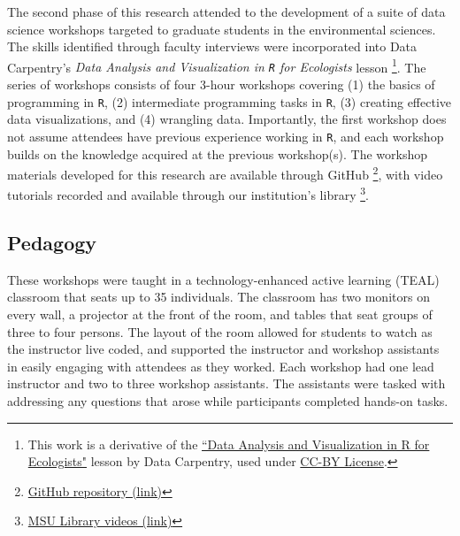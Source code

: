 \documentclass[12pt]{article}
\begin{document}
\noindent The second phase of this research attended to the  development of a 
suite of data science workshops targeted to graduate students in the 
environmental sciences. The skills identified through faculty interviews were
incorporated into Data Carpentry's \emph{Data Analysis and Visualization in 
\texttt{R} for Ecologists} lesson \citep{ecology_curriculum}\footnote{This
work is a derivative of the \href{https://datacarpentry.org/R-ecology-lesson}{``Data 
Analysis and Visualization in R for Ecologists"} lesson by Data Carpentry, used
under \href{https://creativecommons.org/licenses/by/4.0/}{CC-BY License}.}.
The series of workshops consists of four 3-hour workshops covering (1)
the basics of programming in \texttt{R}, (2) intermediate programming tasks in 
\texttt{R}, (3) creating effective data visualizations, and (4) wrangling data.
Importantly, the first workshop does not assume attendees have previous
experience working in \texttt{R}, and each workshop builds on the knowledge
acquired at the previous workshop(s). The workshop materials developed for this
research are available through GitHub
\footnote{\href{https://github.com/atheobold/data-science-workshops-jse}{GitHub
repository (link)}}, with video tutorials recorded and available through our
institution's library \footnote{\href{http://bit.ly/ws_recordings}{MSU Library
videos (link)}}. 


\subsection{Pedagogy}

\noindent These workshops were taught in a technology-enhanced active learning
(TEAL) classroom that seats up to 35 individuals. The classroom has two monitors
on every wall, a projector at the front of the room, and tables that seat groups
of three to four persons. The layout of the room allowed for students to
watch as the instructor live coded, and supported the instructor and workshop
assistants in easily engaging with attendees as they worked. Each workshop had
one lead instructor and two to three workshop assistants. The assistants were
tasked with addressing any questions that arose while participants completed 
hands-on tasks. 
\end{document}
